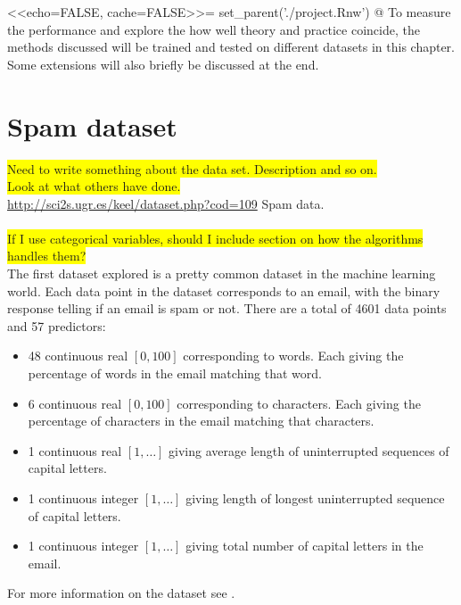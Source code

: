 <<echo=FALSE, cache=FALSE>>=
set_parent('./project.Rnw')
@
%
To measure the performance and explore the how well theory and practice coincide, the methods discussed will be trained and tested on different datasets in this chapter. Some extensions will also briefly be discussed at the end.

\section{Spam dataset}
\label{sec:Spam dataset}
\colorbox{yellow}{Need to write something about the data set. Description and so on.}\\
\colorbox{yellow}{Look at what others have done.} \\
\url{http://sci2s.ugr.es/keel/dataset.php?cod=109} Spam data.\\
\\
\colorbox{yellow}{If I use categorical variables, should I include section on how the algorithms handles them?}\\
 The first dataset explored is a pretty common dataset in the machine learning world. 
 Each data point in the dataset corresponds to an email, with the binary response telling if an email is spam or not. There are a total of 4601 data points and 57 predictors:
 \begin{itemize}
   \item 48 continuous real $[0, 100]$ corresponding to words. Each giving the percentage of words in the email matching that word. 
   \item 6 continuous real $[0, 100]$ corresponding to characters. Each giving the percentage of characters in the email matching that characters.
   \item 1 continuous real $[1, \ldots]$ giving average length of uninterrupted sequences of capital letters. 
   \item 1 continuous integer $[1, \ldots]$ giving length of longest uninterrupted sequence of capital letters.
   \item 1 continuous integer $[1, \ldots]$ giving total number of capital letters in the email.
 \end{itemize}
 For more information on the dataset see \cite{Spamdata}.

